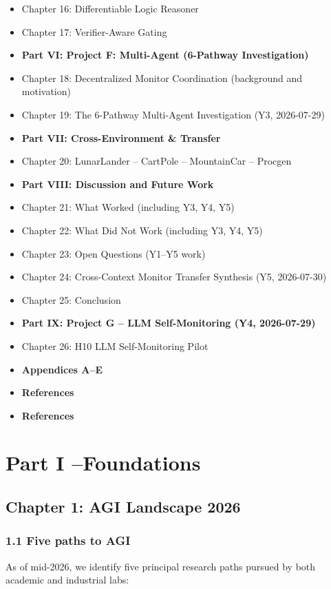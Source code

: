 \documentclass[11pt]{article}
\begin{document}
\begin{itemize}
  \item Chapter 16: Differentiable Logic Reasoner
  \item Chapter 17: Verifier-Aware Gating
  \item \textbf{Part VI: Project F: Multi-Agent (6-Pathway Investigation)}
  \item Chapter 18: Decentralized Monitor Coordination (background and motivation)
  \item Chapter 19: The 6-Pathway Multi-Agent Investigation (Y3, 2026-07-29)
  \item \textbf{Part VII: Cross-Environment \& Transfer}
  \item Chapter 20: LunarLander -- CartPole -- MountainCar -- Procgen
  \item \textbf{Part VIII: Discussion and Future Work}
  \item Chapter 21: What Worked (including Y3, Y4, Y5)
  \item Chapter 22: What Did Not Work (including Y3, Y4, Y5)
  \item Chapter 23: Open Questions (Y1--Y5 work)
  \item Chapter 24: Cross-Context Monitor Transfer Synthesis (Y5, 2026-07-30)
  \item Chapter 25: Conclusion
  \item \textbf{Part IX: Project G -- LLM Self-Monitoring (Y4, 2026-07-29)}
  \item Chapter 26: H10 LLM Self-Monitoring Pilot
  \item \textbf{Appendices A–E}
  \item \textbf{References}
  \item \textbf{References}
\end{itemize}


\hrulefill

\section{Part I --Foundations}

\subsection{Chapter 1: AGI Landscape 2026}

\subsubsection{1.1 Five paths to AGI}

As of mid-2026, we identify five principal research paths pursued by both academic
and industrial labs:
\end{document}
